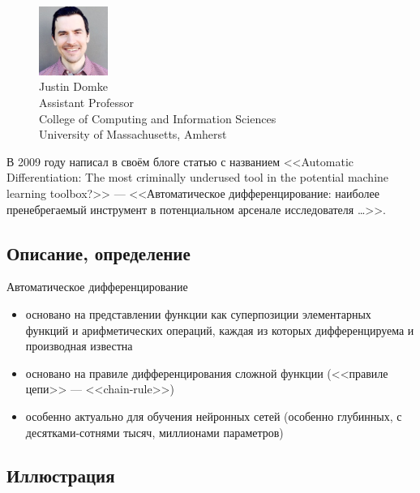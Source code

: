 \documentclass{beamer}
\begin{document}
\begin{frame}{\secname}{\subsecname}
  \begin{figure}
	\includegraphics[width=0.2\textwidth,left]{domke-headshot}
	\caption{
	  Justin Domke \\
	  Assistant Professor \\
	  College of Computing and Information Sciences \\
	  University of Massachusetts, Amherst
	}
  \end{figure} \pause
	В 2009 году написал в своём блоге статью с названием \pause <<Automatic
	Differentiation: The most criminally underused tool in the potential machine
	learning toolbox?>>
  --- <<Автоматическое дифференцирование: наиболее пренебрегаемый
  инструмент в потенциальном арсенале исследователя \ldots>>.
\end{frame}


\subsection{Описание, определение}

\begin{frame}{\secname}{\subsecname}
  Автоматическое дифференцирование \pause
  \begin{itemize}
	\item основано на представлении функции как суперпозиции элементарных
	  функций и арифметических операций, каждая из которых дифференцируема и
	  производная известна \pause
	\item основано на правиле дифференцирования сложной функции (<<правиле
	  цепи>> --- <<chain-rule>>) \pause
	\item особенно актуально для обучения нейронных сетей (особенно глубинных, с
		десятками-сотнями тысяч, миллионами параметров)
  \end{itemize}
\end{frame}


\subsection{Иллюстрация}
\end{document}
